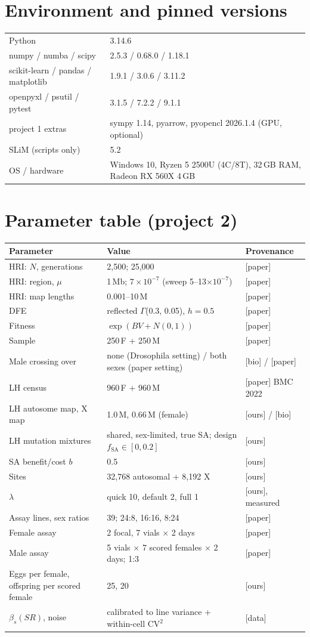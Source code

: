 \chapter{Environment and pinned versions}\label{app:env}
\begin{tabularx}{\textwidth}{lX}\toprule
Python & 3.14.6\\
numpy / numba / scipy & 2.5.3 / 0.68.0 / 1.18.1\\
scikit-learn / pandas / matplotlib & 1.9.1 / 3.0.6 / 3.11.2\\
openpyxl / psutil / pytest & 3.1.5 / 7.2.2 / 9.1.1\\
project 1 extras & sympy 1.14, pyarrow, pyopencl 2026.1.4 (GPU, optional)\\
SLiM (scripts only) & 5.2\\
OS / hardware & Windows 10, Ryzen 5 2500U (4C/8T), 32\,GB RAM, Radeon RX 560X 4\,GB\\\bottomrule
\end{tabularx}

\chapter{Parameter table (project 2)}
\begin{longtable}{p{4.6cm}p{7.2cm}p{3.4cm}}\toprule
Parameter & Value & Provenance\\\midrule\endhead
HRI: $N$, generations & 2,500; 25,000 & [paper]\\
HRI: region, $\mu$ & 1\,Mb; $7\times10^{-7}$ (sweep 5--13$\times10^{-7}$) & [paper]\\
HRI: map lengths & 0.001--10\,M & [paper]\\
DFE & reflected $\Gamma$(0.3, 0.05), $h=0.5$ & [paper]\\
Fitness & $\exp(BV+N(0,1))$ & [paper]\\
Sample & 250\,F + 250\,M & [paper]\\
Male crossing over & none (Drosophila setting) / both sexes (paper setting) & [bio] / [paper]\\
LH census & 960\,F + 960\,M & [paper] BMC 2022\\
LH autosome map, X map & 1.0\,M, 0.66\,M (female) & [ours] / [bio]\\
LH mutation mixtures & shared, sex-limited, true SA; design $f_\mathrm{SA}\in[0,0.2]$ & [ours]\\
SA benefit/cost $b$ & 0.5 & [ours]\\
Sites & 32,768 autosomal + 8,192 X & [ours]\\
$\lambda$ & quick 10, default 2, full 1 & [ours], measured\\
Assay lines, sex ratios & 39; 24:8, 16:16, 8:24 & [paper]\\
Female assay & 2 focal, 7 vials $\times$ 2 days & [paper]\\
Male assay & 5 vials $\times$ 7 scored females $\times$ 2 days; 1:3 & [paper]\\
Eggs per female, offspring per scored female & 25, 20 & [ours]\\
$\beta_s(SR)$, noise & calibrated to line variance + within-cell CV$^2$ & [data]\\\bottomrule
\end{longtable}

